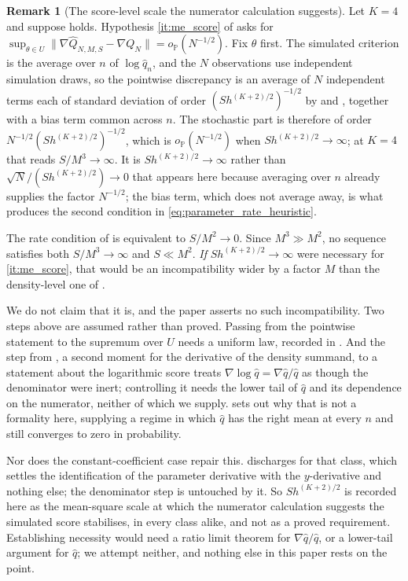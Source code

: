 \documentclass[11pt]{article}
\theoremstyle{definition}
\newtheorem{remark}[remark]{Remark}
\newcommand{\Pp}{\mathbb{P}}
\newcommand{\op}{o_{\Pp}}
\begin{document}
\begin{remark}[The score-level scale the numerator calculation suggests]\label{rem:score_scale}
Let $K=4$ and suppose  holds. Hypothesis \ref{it:me_score} of  asks for $\sup_{\theta\in U}\lVert\nabla\widehat Q_{N,M,S}-\nabla Q_N\rVert=\op(N^{-1/2})$. Fix $\theta$ first. The simulated criterion is the average over $n$ of $\log\widehat q_n$, and the $N$ observations use independent simulation draws, so the pointwise discrepancy is an average of $N$ independent terms each of standard deviation of order $(Sh^{(K+2)/2})^{-1/2}$ by  and , together with a bias term common across $n$. The stochastic part is therefore of order $N^{-1/2}(Sh^{(K+2)/2})^{-1/2}$, which is $\op(N^{-1/2})$ when $Sh^{(K+2)/2}\to\infty$; at $K=4$ that reads $S/M^3\to\infty$. It is $Sh^{(K+2)/2}\to\infty$ rather than $\sqrt N/(Sh^{(K+2)/2})\to0$ that appears here because averaging over $n$ already supplies the factor $N^{-1/2}$; the bias term, which does not average away, is what produces the second condition in \eqref{eq:parameter_rate_heuristic}.

The rate condition of \citet{BrandtSantaClara2002} is equivalent to $S/M^2\to0$. Since $M^3\gg M^2$, no sequence satisfies both $S/M^3\to\infty$ and $S\ll M^2$. \emph{If} $Sh^{(K+2)/2}\to\infty$ were necessary for \ref{it:me_score}, that would be an incompatibility wider by a factor $M$ than the density-level one of .

We do not claim that it is, and the paper asserts no such incompatibility. Two steps above are assumed rather than proved. Passing from the pointwise statement to the supremum over $U$ needs a uniform law, recorded in . And the step from , a second moment for the derivative of the density summand, to a statement about the logarithmic score treats $\nabla\log\widehat q=\nabla\widehat q/\widehat q$ as though the denominator were inert; controlling it needs the lower tail of $\widehat q$ and its dependence on the numerator, neither of which we supply.  sets out why that is not a formality here,  supplying a regime in which $\widehat q$ has the right mean at every $n$ and still converges to zero in probability.

Nor does the constant-coefficient case repair this.  discharges  for that class, which settles the identification of the parameter derivative with the $y$-derivative and nothing else; the denominator step is untouched by it. So $Sh^{(K+2)/2}$ is recorded here as the mean-square scale at which the numerator calculation suggests the simulated score stabilises, in every class alike, and not as a proved requirement. Establishing necessity would need a ratio limit theorem for $\nabla\widehat q/\widehat q$, or a lower-tail argument for $\widehat q$; we attempt neither, and nothing else in this paper rests on the point.
\end{remark}
\end{document}
